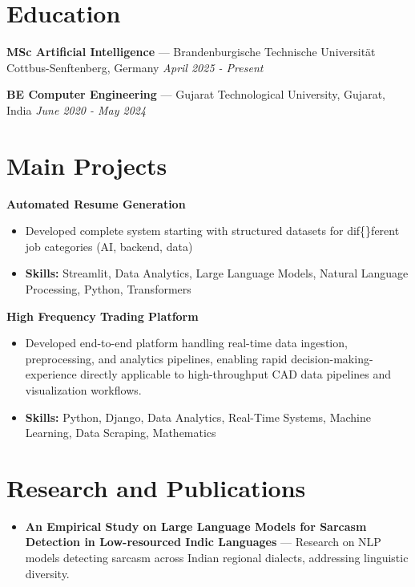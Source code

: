 \documentclass[a4paper,10pt]{article}
\begin{document}
\section*{Education}
\textbf{MSc Artificial Intelligence} — Brandenburgische Technische Universität Cottbus-Senftenberg, Germany \hfill \textit{April 2025 - Present}\par
\vspace{1.5pt}
\textbf{BE Computer Engineering} — Gujarat Technological University, Gujarat, India \hfill \textit{June 2020 - May 2024}\par

\section*{Main Projects}
\textbf{Automated Resume Generation}\par
\vspace{1pt}
\begin{itemize}
  \item Developed complete system starting with structured datasets for dif\{\}ferent job categories (AI, backend, data)
  \item \textbf{Skills:} Streamlit, Data Analytics, Large Language Models, Natural Language Processing, Python, Transformers
\end{itemize}
\vspace{3pt}
\textbf{High Frequency Trading Platform}\par
\vspace{1pt}
\begin{itemize}
  \item Developed end-to-end platform handling real-time data ingestion, preprocessing, and analytics pipelines, enabling rapid decision-making-experience directly applicable to high-throughput CAD data pipelines and visualization workflows.
  \item \textbf{Skills:} Python, Django, Data Analytics, Real-Time Systems, Machine Learning, Data Scraping, Mathematics
\end{itemize}

\section*{Research and Publications}
\begin{itemize}
\item \textbf{An Empirical Study on Large Language Models for Sarcasm Detection in Low-resourced Indic Languages} — Research on NLP models detecting sarcasm across Indian regional dialects, addressing linguistic diversity.
\end{itemize}
\end{document}
